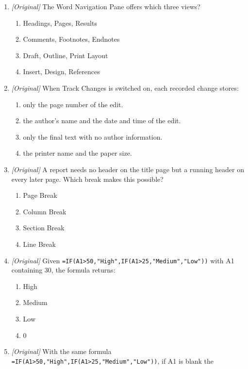 \documentclass[11pt]{article}
\begin{document}
\begin{enumerate}[label=\textbf{Q\arabic*.}, leftmargin=*]
\begin{enumerate}[label=\Alph*.]
    \item Hanging indent --- centres the first line and left-aligns the rest
  \end{enumerate}
\item \textit{[Original]} The Word Navigation Pane offers which three views?
  \begin{enumerate}[label=\Alph*.]
    \item Headings, Pages, Results
    \item Comments, Footnotes, Endnotes
    \item Draft, Outline, Print Layout
    \item Insert, Design, References
  \end{enumerate}
\item \textit{[Original]} When Track Changes is switched on, each recorded
  change stores:
  \begin{enumerate}[label=\Alph*.]
    \item only the page number of the edit.
    \item the author's name and the date and time of the edit.
    \item only the final text with no author information.
    \item the printer name and the paper size.
  \end{enumerate}
\item \textit{[Original]} A report needs no header on the title page but a
  running header on every later page. Which break makes this possible?
  \begin{enumerate}[label=\Alph*.]
    \item Page Break
    \item Column Break
    \item Section Break
    \item Line Break
  \end{enumerate}
\item \textit{[Original]} Given
  \texttt{=IF(A1>50,"High",IF(A1>25,"Medium","Low"))} with A1 containing 30,
  the formula returns:
  \begin{enumerate}[label=\Alph*.]
    \item High
    \item Medium
    \item Low
    \item 0
  \end{enumerate}
\item \textit{[Original]} With the same formula
  \texttt{=IF(A1>50,"High",IF(A1>25,"Medium","Low"))}, if A1 is blank the

\end{enumerate}
\end{document}
